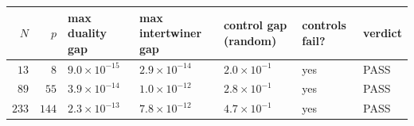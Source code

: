 \begin{tabular}{rrlllll}
\toprule
$N$ & $p$ & max duality gap & max intertwiner gap & control gap (random) & controls fail? & verdict \\
\midrule
$13$ & $8$ & $9.0\times10^{-15}$ & $2.9\times10^{-14}$ & $2.0\times10^{-1}$ & yes & PASS \\
$89$ & $55$ & $3.9\times10^{-14}$ & $1.0\times10^{-12}$ & $2.8\times10^{-1}$ & yes & PASS \\
$233$ & $144$ & $2.3\times10^{-13}$ & $7.8\times10^{-12}$ & $4.7\times10^{-1}$ & yes & PASS \\
\bottomrule
\end{tabular}
